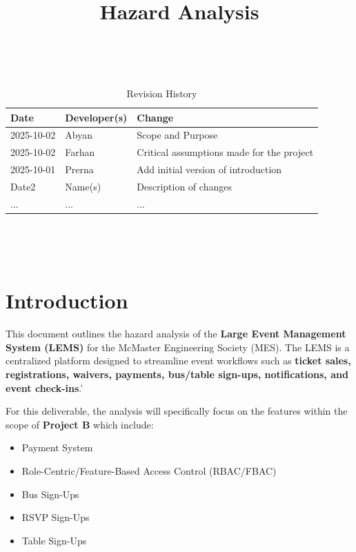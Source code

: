 \documentclass{article}
\title{Hazard Analysis\\\progname}
\author{\authname}
\date{}
\begin{document}
\maketitle
\thispagestyle{empty}

~\newpage


\begin{table}[hp]
\caption{Revision History} \label{TblRevisionHistory}
\begin{tabularx}{\textwidth}{llX}
\toprule
\textbf{Date} & \textbf{Developer(s)} & \textbf{Change}\\
\midrule
2025-10-02 & Abyan & Scope and Purpose\\
2025-10-02 & Farhan & Critical assumptions made for the project\\
2025-10-01 & Prerna & Add initial version of introduction\\
Date2 & Name(s) & Description of changes\\
... & ... & ...\\
\bottomrule
\end{tabularx}
\end{table}

~\newpage

\tableofcontents

~\newpage



\section{Introduction}

This document outlines the hazard analysis of the \textbf{Large Event Management System (LEMS)} for the McMaster
Engineering Society (MES). The LEMS is a centralized platform designed to streamline event workflows such as
 \textbf{ticket sales, registrations, waivers, payments, bus/table sign-ups, notifications, and event check-ins}.'
\newline

\noindent
For this deliverable, the analysis will specifically focus on the features within the scope of \textbf{Project B} which include:

\begin{itemize}
    \item Payment System
    \item Role-Centric/Feature-Based Access Control (RBAC/FBAC)
    \item Bus Sign-Ups
    \item RSVP Sign-Ups
    \item Table Sign-Ups
\end{itemize}
\end{document}
